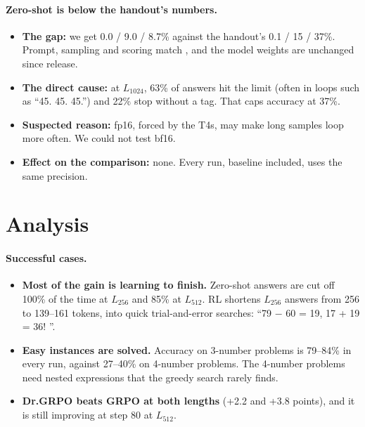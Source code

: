 \documentclass[10.5pt]{article}
\begin{document}
\paragraph{Zero-shot is below the handout's numbers.}
\begin{itemize}
\item \textbf{The gap:} we get 0.0 / 9.0 / 8.7\% against the handout's 0.1 / 15 / 37\%. Prompt, sampling and scoring
  match , and the model weights are unchanged since release.
\item \textbf{The direct cause:} at $L_{1024}$, 63\% of answers hit the limit (often in loops such as ``45. 45. 45.'') and
  22\% stop without a tag. That caps accuracy at 37\%.
\item \textbf{Suspected reason:} fp16, forced by the T4s, may make long samples loop more often. We could not test bf16.
\item \textbf{Effect on the comparison:} none. Every run, baseline included, uses the same precision.
\end{itemize}

\section{Analysis}
\paragraph{Successful cases.}
\begin{itemize}
\item \textbf{Most of the gain is learning to finish.} Zero-shot answers are cut off 100\% of the time at $L_{256}$ and
  85\% at $L_{512}$. RL shortens $L_{256}$ answers from 256 to 139--161 tokens, into quick trial-and-error searches:
  ``79 $-$ 60 = 19, 17 + 19 = 36! ''.
\item \textbf{Easy instances are solved.} Accuracy on 3-number problems is 79--84\% in every run, against 27--40\% on
  4-number problems. The 4-number problems need nested expressions that the greedy search rarely finds.
\item \textbf{Dr.GRPO beats GRPO at both lengths} (+2.2 and +3.8 points), and it is still improving at step 80 at $L_{512}$.
\end{itemize}
\end{document}
